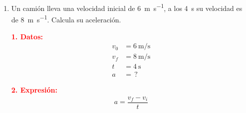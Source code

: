 \documentclass[14pt]{extarticle}
\newcommand{\textocolor}[2]{\textbf{\textcolor{#1}{#2}}}
\begin{document}
\begin{enumerate}
Convertimos la velocidad de \SI{50}{\kilo\meter\per\hour} a \unit{\meter\per\second}:
\begin{align*}
\SI[per-mode=fraction]{50}{\kilo\meter\per\hour} \left( \dfrac{\SI{d3}{\meter}}{\SI{1}{\kilo\meter}} \right) \left( \dfrac{\SI{1}{\hour}}{\SI{3.6d2}{\second}} \right) = \SI[per-mode=fraction]{13.88}{\meter\per\second}
\end{align*}
\begin{minipage}[t]{0.4\linewidth}
\textocolor{red}{1. Datos:}
\begin{align*}
v_{0} &= \SI{0}{\kilo\meter\per\hour} \\
v_{f} &= \SI{50}{\kilo\meter\per\hour} = \SI[per-mode=fraction]{13.88}{\meter\per\second}\\
t &= \SI{6}{\second} \\
a &= \, ?
\end{align*}
\end{minipage}
\hspace{1cm}
\begin{minipage}[t]{0.4\linewidth}
\textocolor{red}{2. Expresión:}
\begin{align*}
a = \dfrac{v_{f} - v_{i}}{t}
\end{align*}
\end{minipage}

\textocolor{red}{3. Sustitución:}
\begin{align*}
a = \dfrac{\displaystyle \SI[per-mode=fraction]{13.88}{\meter\per\second} - \SI[per-mode=fraction]{0}{\meter\per\second}}{\SI{6}{\second}} = \SI[per-mode=fraction]{2.31}{\meter\per\square\second}
\end{align*}
\item Un camión lleva una velocidad inicial de \SI{6}{\meter\per\second}, a los \SI{4}{\second} su velocidad es de \SI{8}{\meter\per\second}. Calcula su aceleración.

\begin{minipage}[t]{0.4\linewidth}
\textocolor{red}{1. Datos:}
\begin{align*}
v_{0} &= \SI{6}{\meter\per\second} \\
v_{f} &= \SI{8}{\meter\per\second}\\
t &= \SI{4}{\second} \\
a &= \, ?
\end{align*}
\end{minipage}
\hspace{1cm}
\begin{minipage}[t]{0.4\linewidth}
\textocolor{red}{2. Expresión:}
\begin{align*}
a = \dfrac{v_{f} - v_{i}}{t}
\end{align*}
\end{minipage}


\end{enumerate}
\end{document}
